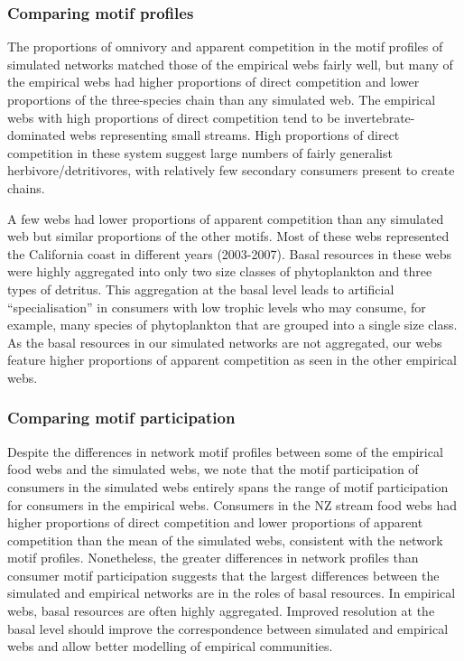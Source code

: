 \documentclass[12pt]{article}
\begin{document}
\begin{spacing}{2.0}
    \subsubsection{Comparing motif profiles}
    
      The proportions of omnivory and apparent competition in the motif profiles of simulated networks matched those of the empirical webs fairly well, but many of the empirical webs had higher proportions of direct competition and lower proportions of the three-species chain than any simulated web.
      The empirical webs with high proportions of direct competition tend to be invertebrate-dominated webs representing small streams.
      High proportions of direct competition in these system suggest large numbers of fairly generalist herbivore/detritivores, with relatively few secondary consumers present to create chains.
    
    
      A few webs had lower proportions of apparent competition than any simulated web but similar proportions of the other motifs.
      Most of these webs represented the California coast in different years (2003-2007).
      Basal resources in these webs were highly aggregated into only two size classes of phytoplankton and three types of detritus.
      This aggregation at the basal level leads to artificial ``specialisation'' in consumers with low trophic levels who may consume, for example, many species of phytoplankton that are grouped into a single size class.
      As the basal resources in our simulated networks are not aggregated, our webs feature higher proportions of apparent competition as seen in the other empirical webs.
    
    
    \subsubsection{Comparing motif participation}
      
      Despite the differences in network motif profiles between some of the empirical food webs and the simulated webs, we note that the motif participation of consumers in the simulated webs entirely spans the range of motif participation for consumers in the empirical webs.
      Consumers in the NZ stream food webs had higher proportions of direct competition and lower proportions of apparent competition than the mean of the simulated webs, consistent with the network motif profiles.
      Nonetheless, the greater differences in network profiles than consumer motif participation suggests that the largest differences between the simulated and empirical networks are in the roles of basal resources.
      In empirical webs, basal resources are often highly aggregated. 
      Improved resolution at the basal level should improve the correspondence between simulated and empirical webs and allow better modelling of empirical communities.
    


\end{spacing}
\end{document}
